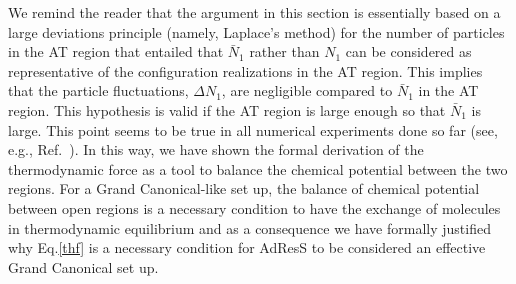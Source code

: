 \documentclass[aps,a4paper,reprint,onecolumn]{revtex4}
\begin{document}
We remind the reader that the argument in this section is essentially based on a large deviations principle (namely, Laplace's method) for the number of particles in the AT region that entailed that $\bar N_{1}$ rather than $N_{1}$ can be considered as representative of the configuration realizations in the AT region. This implies that the particle fluctuations, $\Delta N_{1}$,
are negligible compared to $\bar N_{1}$ in the AT region. This hypothesis is valid if the AT region is large enough so that $\bar N_{1}$ is large. This point seems to be true in all numerical experiments done so far (see, e.g., Ref.~). In this way, we have shown the formal derivation of the thermodynamic force as a tool to balance the chemical potential between the two regions. For a Grand Canonical-like set up, the balance of chemical potential between open regions is a necessary condition to have the exchange of molecules in thermodynamic equilibrium and as a consequence we have formally justified why Eq.\ref{thf} is a necessary condition for AdResS to be considered an effective Grand Canonical set up.
\end{document}
